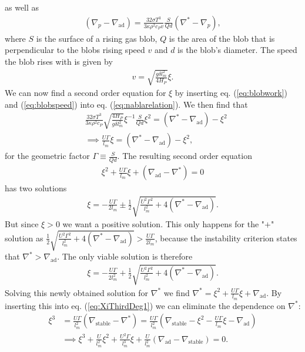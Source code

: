 \documentclass{emulateapj}
\begin{document}
	as well as 
	\begin{align}
		(\nabla_p - \nabla_\text{ad}) = \frac{32\sigma T^3}{3\kappa \rho^2 c_P v}\frac{S}{Qd}(\nabla^* - \nabla_p),
		\label{eq:blobwork}
	\end{align}
	where $S$ is the surface of a rising gas blob, $Q$ is the area of the blob that is perpendicular to the blobs rising speed $v$ and $d$ is the blob's diameter. The speed the blob rises with is given by 
	\begin{align}
		v = \sqrt{\frac{g\delta l_m^2}{4H_P}}\xi.
		\label{eq:blobspeed}
	\end{align}
	We can now find a second order equation for $\xi$ by inserting eq. (\ref{eq:blobwork}) and (\ref{eq:blobspeed}) into eq. (\ref{eq:nablarelation}). We then find that 
	\begin{align}
		&\frac{32\sigma T^3}{3\kappa\rho^2c_P}\sqrt{\frac{4 H_P}{g\delta l_m^2}}\xi^{-1} \frac{S}{Qd}\xi^2 = (\nabla^* - \nabla_\text{ad}) - \xi^2\\
		&\implies \frac{U\Gamma}{l_m}\xi = (\nabla^* - \nabla_\text{ad}) - \xi^2,
	\end{align}
	for the geometric factor $\Gamma \equiv \frac{S}{Qd}$. The resulting second order equation
	\begin{align}
		\xi^2 + \frac{U\Gamma}{l_m}\xi + (\nabla_\text{ad} - \nabla^*) = 0
	\end{align}
	has two solutions
	\begin{align}
		\xi = -\frac{U\Gamma}{2l_m}\pm \frac{1}{2}\sqrt{\frac{U^2\Gamma^2}{l_m^2} + 4(\nabla^* - \nabla_\text{ad})}.
	\end{align}
	But since $\xi>0$ we want a positive solution. This only happens for the "$+$" solution as 
	$\frac{1}{2}\sqrt{\frac{U^2\Gamma^2}{l_m^2} + 4(\nabla^* - \nabla_\text{ad})}>\frac{U\Gamma}{2l_m}$, because the instability criterion states that $\nabla^* > \nabla_\text{ad}$. The only viable solution is therefore 
	\begin{align}
		\xi = -\frac{U\Gamma}{2l_m^2} + \frac{1}{2}\sqrt{\frac{U^2\Gamma^2}{l_m^2} + 4(\nabla^* - \nabla_\text{ad})}.
	\end{align}
	Solving this newly obtained solution for $\nabla^*$ we find $\nabla^* = \xi^2 + \frac{U\Gamma}{l_m}\xi + \nabla_\text{ad}$. By inserting this into eq. (\ref{eq:XiThirdDeg1}) we can eliminate the dependence on $\nabla^*$:
	\begin{align*}
	 	\xi^3 &= \frac{U\Gamma}{l_m^2}(\nabla_\text{stable} - \nabla^*) = \frac{U\Gamma}{l_m^2}(\nabla_\text{stable} - \xi^2 - \frac{U\Gamma}{l_m}\xi - \nabla_\text{ad})\\
	 	&\implies \xi^3 + \frac{U}{l_m^2}\xi^2 + \frac{U^2\Gamma}{l_m^3}\xi + \frac{U}{l_m^2}(\nabla_\text{ad} - \nabla_\text{stable}) = 0.
	\end{align*}
\end{document}
